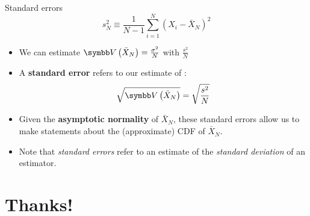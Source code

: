 \documentclass[aspectratio=169,11pt]{beamer}
\begin{document}
\begin{frame}{Standard errors}
\[
s_N^2 \equiv \frac{1}{N-1}\sum_{i=1}^{N} \left(X_i - \bar{X}_N \right)^2
\]
\begin{itemize}
	\item We can estimate $\Var\left(\bar{X}_N\right)=\frac{\sigma^2}{N}$ with $\frac{s^2}{N}$


	\item A {\bf standard error} refers to our estimate of :
	\begin{align*}
	\sqrt{\Var\left( \bar{X}_N \right)} = \sqrt{\frac{s^2}{N}}
\end{align*}

	\item Given the {\bf asymptotic normality} of $\bar{X}_N$, these standard errors allow us to
			make statements about the (approximate) CDF of $\bar{X}_N$.
	

	\item Note that \emph{standard errors} refer to an estimate of the \emph{standard deviation}
			of an estimator.
\end{itemize}
\end{frame}


\section{Thanks!}
\end{document}

